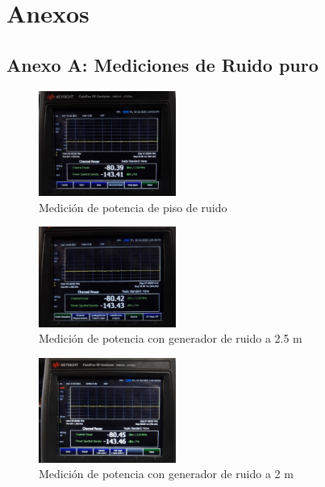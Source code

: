 \documentclass[conference]{IEEEtran}
\begin{document}
	
		
	
	\newpage
	
	\section{Anexos}
	
	\subsection{Anexo A: Mediciones de Ruido puro}
	\begin{figure}[h]
		\centering
		\includegraphics[width=0.4\textwidth]{media/M-PisoRuido.jpg}
		\caption{Medición de potencia de piso de ruido}
		\label{fig:M-PisoRuido}
	\end{figure}
	
	\begin{figure}[h]
		\centering
		\includegraphics[width=0.4\textwidth]{media/M-Ruido2.5.jpg}
		\caption{Medición de potencia con generador de ruido a 2.5 m}
		\label{fig:M-Ruido2.5}
	\end{figure}
	
	\begin{figure}[h]
		\centering
		\includegraphics[width=0.4\textwidth]{media/M-Ruido2.jpg}
		\caption{Medición de potencia con generador de ruido a 2 m}
		\label{fig:M-Ruido2}
	\end{figure}
	
\end{document}
